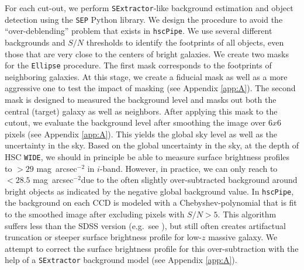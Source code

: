 \documentclass{emulateapj}
\def\sb{mag~arcsec$^{-2}$}
\begin{document}
\begin{CJK*}{UTF8}{gbsn}
    For each cut-out, we perform \texttt{SExtractor}-like background estimation and 
    object detection using the \texttt{SEP} Python library. 
    We design the procedure to avoid the ``over-deblending'' problem that exists in
    \texttt{hscPipe}. 
    We use several different backgrounds and $S/N$ thresholds to identify the 
    footprints of all objects, even those that are very close to the centers of bright 
    galaxies. 
    We create two masks for the \texttt{Ellipse} procedure. 
    The first mask corresponds to the footprints of neighboring galaxies. 
    At this stage, we create a fiducial mask as well as a more aggressive one to test 
    the impact of masking (see Appendix \ref{app:A}). 
    The second mask is designed to measured the background level and masks out both 
    the central (target) galaxy as well as neighbors. 
    After applying this mask to the cutout, we evaluate the background level after 
    smoothing the image over $6x6$ pixels (see Appendix \ref{app:A}). 
    This yields the global sky level as well as the uncertainty in the sky. 
    Based on the global uncertainty in the sky, at the depth of HSC \texttt{WIDE}, 
    we should in principle be able to measure surface brightness profiles to $> 29$ \sb
    in $i$-band.  
    However, in practice, we can only reach to $<28.5$ \sb due to the often slightly 
    over-subtracted background around bright objects as indicated by the negative
    global background value.
    In \texttt{hscPipe}, the background on each CCD is modeled with a 
    Chebyshev-polynomial that is fit to the smoothed image after excluding pixels with 
    $S/N >5$.
    This algorithm suffers less than the SDSS version (e.g.\ see \citealt{Blanton2011}),
    but still often creates artifactual truncation or steeper surface brightness profile
    for low-$z$ massive galaxy. 
    We attempt to correct the surface brightness profile for this over-subtraction 
    with the help of a \texttt{SExtractor} background model (see Appendix \ref{app:A}). 
    
   
    

\end{CJK*}
\end{document}
